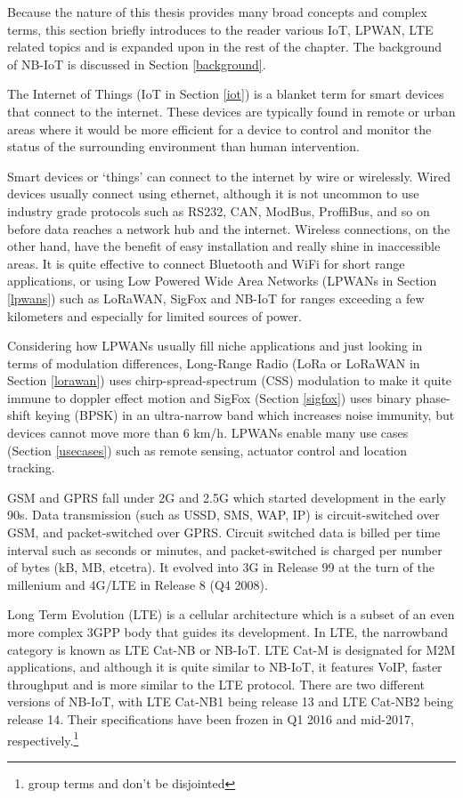 \documentclass[]{article}
\begin{document}
Because the nature of this thesis provides many broad concepts and
complex terms, this section briefly introduces to the reader various
IoT, LPWAN, LTE related topics and is expanded upon in the rest of the
chapter. The background of NB-IoT is discussed in Section
\ref{background}.

The Internet of Things (IoT in Section \ref{iot}) is a blanket term for
smart devices that connect to the internet. These devices are typically
found in remote or urban areas where it would be more efficient for a
device to control and monitor the status of the surrounding environment
than human intervention.

Smart devices or `things' can connect to the internet by wire or
wirelessly. Wired devices usually connect using ethernet, although it is
not uncommon to use industry grade protocols such as RS232, CAN, ModBus,
ProffiBus, and so on before data reaches a network hub and the internet.
Wireless connections, on the other hand, have the benefit of easy
installation and really shine in inaccessible areas. It is quite
effective to connect Bluetooth and WiFi for short range applications, or
using Low Powered Wide Area Networks (LPWANs in Section \ref{lpwans})
such as LoRaWAN, SigFox and NB-IoT for ranges exceeding a few kilometers
and especially for limited sources of power.

Considering how LPWANs usually fill niche applications and just looking
in terms of modulation differences, Long-Range Radio (LoRa or LoRaWAN in
Section \ref{lorawan}) uses chirp-spread-spectrum (CSS) modulation to
make it quite immune to doppler effect motion and SigFox (Section
\ref{sigfox}) uses binary phase-shift keying (BPSK) in an ultra-narrow
band which increases noise immunity, but devices cannot move more than 6
km/h. LPWANs enable many use cases (Section \ref{usecases}) such as
remote sensing, actuator control and location tracking.

GSM and GPRS fall under 2G and 2.5G which started development in the
early 90s. Data transmission (such as USSD, SMS, WAP, IP) is
circuit-switched over GSM, and packet-switched over GPRS. Circuit
switched data is billed per time interval such as seconds or minutes,
and packet-switched is charged per number of bytes (kB, MB, etcetra). It
evolved into 3G in Release 99 at the turn of the millenium and 4G/LTE in
Release 8 (Q4 2008).

Long Term Evolution (LTE) is a cellular architecture which is a subset
of an even more complex 3GPP body that guides its development. In LTE,
the narrowband category is known as LTE Cat-NB or NB-IoT. LTE Cat-M is
designated for M2M applications, and although it is quite similar to
NB-IoT, it features VoIP, faster throughput and is more similar to the
LTE protocol. There are two different versions of NB-IoT, with LTE
Cat-NB1 being release 13 and LTE Cat-NB2 being release 14. Their
specifications have been frozen in Q1 2016 and mid-2017,
respectively.\footnote{group terms and don't be disjointed}
\end{document}
